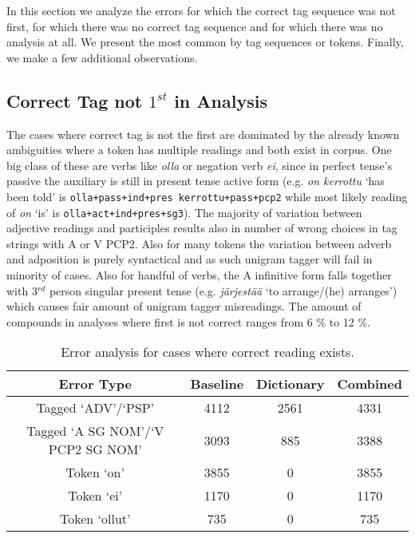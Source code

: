 \documentclass[postprint]{flammie}
\begin{document}
In this section we analyze the errors for which the correct tag
sequence was not first, for which there was no correct tag sequence
and for which there was no analysis at all. We present the most common
by tag sequences or tokens. Finally, we make a few
additional observations.

\subsection{Correct Tag not $1^{st}$ in Analysis}

The cases where correct tag is not the first are dominated by the already
known ambiguities where a token has multiple readings and both exist in corpus.
One big class of these are verbs like \emph{olla} or negation verb \emph{ei},
since in perfect tense's passive the auxiliary is still in present tense
active form (e.g. \emph{on kerrottu} `has been told' is 
\texttt{olla+pass+ind+pres kerrottu+pass+pcp2}
while most likely reading of \emph{on} `is' is \texttt{olla+act+ind+pres+sg3}).
The majority of variation between adjective readings and participles results
also in number of wrong choices in tag strings with A or V PCP2. 
Also for many tokens the variation between adverb and adposition is purely
syntactical and as such unigram tagger will fail in minority of cases.
Also for handful of verbs, the A infinitive form falls together with
3${}^{rd}$ person singular present tense (e.g. \emph{järjestää} `to arrange/(he) arranges') which causes fair amount of unigram tagger misreadings. The amount
of compounds in analyses where first is not correct ranges from 6 \% to 12 \%.

\begin{table}[h!]
  \centering
  \caption{Error analysis for cases where correct reading exists.
  }\label{tab:incorrect1}
  \begin{scriptsize}
    \begin{tabular}{c|c|c|c}
      \hline
      Error Type & Baseline & Dictionary & Combined \\
      \hline 
	  Tagged `ADV'/`PSP' & 4112 & 2561 & 4331 \\
	  Tagged `A SG NOM'/`V PCP2 SG NOM' & 3093 & 885 & 3388 \\
	  \hline
	  Token `on' & 3855 & 0 & 3855 \\
	  Token `ei' & 1170 & 0 & 1170 \\
	  Token `ollut' & 735 & 0 & 735 \\
	  \hline 
    \end{tabular}
  \end{scriptsize}
\end{table}
\end{document}
